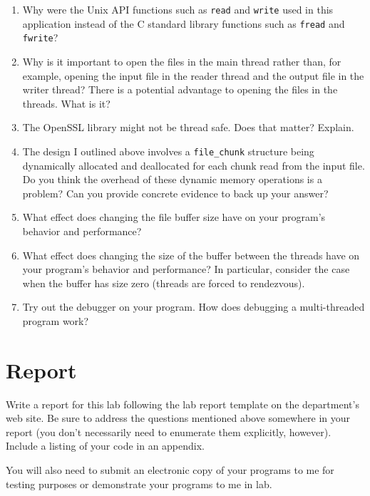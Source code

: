\documentclass[twocolumn]{article}
\newcommand{\code}[1]{\texttt{#1}}
\begin{document}
\begin{enumerate}

\item Why were the Unix API functions such as \code{read} and \code{write} used in this
application instead of the C standard library functions such as \code{fread} and \code{fwrite}?
  
\item Why is it important to open the files in the main thread rather than, for example, opening
the input file in the reader thread and the output file in the writer thread? There is a
potential advantage to opening the files in the threads. What is it?
  
\item The OpenSSL library might not be thread safe. Does that matter? Explain.
  
\item The design I outlined above involves a \code{file\_\-chunk} structure being dynamically
allocated and deallocated for each chunk read from the input file. Do you think the overhead of
these dynamic memory operations is a problem? Can you provide concrete evidence to back up your
answer?

\item What effect does changing the file buffer size have on your program's behavior and
performance?

\item What effect does changing the size of the buffer between the threads have on your
program's behavior and performance? In particular, consider the case when the buffer has size
zero (threads are forced to rendezvous).

\item Try out the debugger on your program. How does debugging a multi-threaded program work?

\end{enumerate}

\section{Report}

Write a report for this lab following the lab report template on the department's web site. Be
sure to address the questions mentioned above somewhere in your report (you don't necessarily
need to enumerate them explicitly, however). Include a listing of your code in an appendix.

You will also need to submit an electronic copy of your programs to me for testing purposes or
demonstrate your programs to me in lab.
\end{document}
